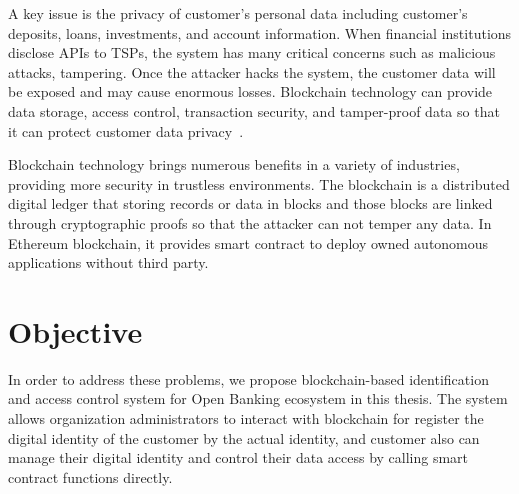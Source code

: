 A key issue is the privacy of customer's personal data including customer's deposits, loans, investments, and account information. When financial institutions disclose APIs to TSPs, the system has many critical concerns such as malicious attacks, tampering. Once the attacker hacks the system, the customer data will be exposed and may cause enormous losses. Blockchain technology can provide data storage, access control, transaction security, and tamper-proof data so that it can protect customer data privacy~\cite{wang2020blockchain}.\par
Blockchain technology brings numerous benefits in a variety of industries, providing more security in trustless environments. The blockchain is a distributed digital ledger that storing records or data in blocks and those blocks are linked through cryptographic proofs so that the attacker can not temper any data. In Ethereum blockchain, it provides smart contract to deploy owned autonomous applications without third party.

\section{Objective}

In order to address these problems, we propose blockchain-based identification and access control system for Open Banking ecosystem in this thesis. The system allows organization administrators to interact with blockchain for register the digital identity of the customer by the actual identity, and customer also can manage their digital identity and control their data access by calling smart contract functions directly. \par